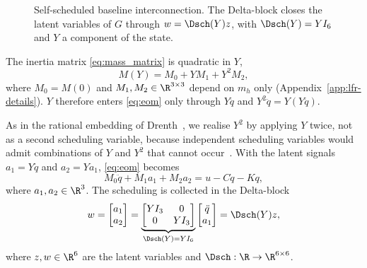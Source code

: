 \begin{figure}[t]
  \centering
  
  \caption{Self-scheduled baseline interconnection. The Delta-block closes
  the latent variables of $G$ through $w=\Dsch(Y)z$, with
  $\Dsch(Y)=YI_6$ and $Y$ a component of the state.}
  \label{fig:lfr}
\end{figure}

The inertia matrix \eqref{eq:mass_matrix} is quadratic in $Y$,
\begin{equation}
  M(Y)=M_0+YM_1+Y^2M_2,
  \label{eq:Msplit}
\end{equation}
where $M_0=M(0)$ and $M_1,M_2\in\R^{3\times3}$ depend on $m_h$ only
(Appendix~\ref{app:lfr-details}).
$Y$ therefore enters \eqref{eq:eom} only through $Y\ddot q$ and
$Y^2\ddot q=Y(Y\ddot q)$.

As in the rational embedding of Drenth~\cite[Eq.~(2.9)]{drenth2025thesis},
we realise $Y^2$ by applying $Y$ twice, not as a second scheduling variable,
because independent scheduling variables would admit combinations of $Y$ and
$Y^2$ that cannot occur~\cite[Sec.~2.1.1]{drenth2025thesis}.
With the latent signals $a_1=Y\ddot q$ and $a_2=Ya_1$, \eqref{eq:eom}
becomes
\begin{equation}
  M_0\ddot q+M_1a_1+M_2a_2=u-C\dot q-Kq,
  \label{eq:lfr_constant}
\end{equation}
where $a_1,a_2\in\R^3$.
The scheduling is collected in the Delta-block
\begin{equation}
  w=\begin{bmatrix}a_1\\a_2\end{bmatrix}
   =\underbrace{\begin{bmatrix}YI_3&0\\0&YI_3\end{bmatrix}}_{\Dsch(Y)=YI_6}
    \begin{bmatrix}\ddot q\\a_1\end{bmatrix}
   =\Dsch(Y)z,
  \label{eq:delta}
\end{equation}
where $z,w\in\R^6$ are the latent variables and
$\Dsch:\R\to\R^{6\times6}$.

